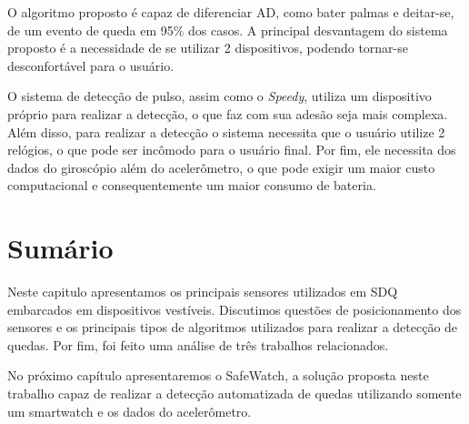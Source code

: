 O algoritmo proposto é capaz de diferenciar \ac{AD}, como bater palmas e deitar-se, de um evento de queda em 95\% dos casos. A principal desvantagem do sistema proposto é a necessidade de se utilizar 2 dispositivos, podendo tornar-se desconfortável para o usuário.

O sistema de detecção de pulso, assim como o \textit{Speedy}, utiliza  um dispositivo próprio para realizar a detecção, o que faz com sua adesão seja mais complexa. Além disso, para realizar a detecção o sistema necessita que o usuário utilize 2 relógios, o que pode ser incômodo para o usuário final. Por fim, ele necessita dos dados do giroscópio além do acelerômetro, o que pode exigir um maior custo computacional e consequentemente um maior consumo de bateria. 


\section{Sumário}
Neste capitulo apresentamos os principais sensores utilizados em \ac{SDQ} embarcados em dispositivos vestíveis. Discutimos questões de posicionamento dos sensores e os principais tipos de algoritmos utilizados para realizar a detecção de quedas. Por fim, foi feito uma análise de três trabalhos relacionados.

No próximo capítulo apresentaremos o SafeWatch, a solução proposta neste trabalho capaz de realizar a detecção automatizada de quedas utilizando somente um smartwatch e os dados do acelerômetro. 







